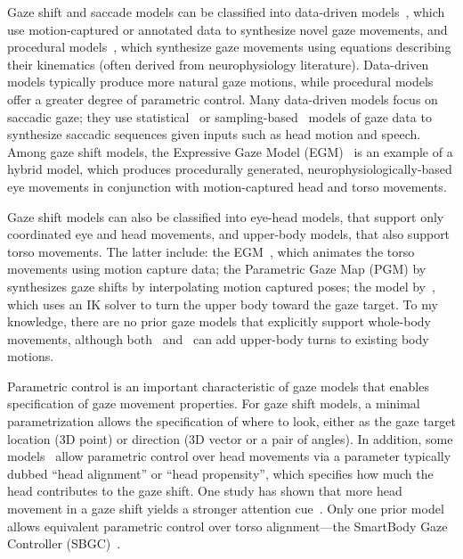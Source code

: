 Gaze shift and saccade models can be classified into data-driven models~\citep{heck2007automated,lance2010expressive,lee2002eyes,deng2005automated,ma2009natural,le2012live}, which use motion-captured or annotated data to synthesize novel gaze movements, and procedural models~\citep{peters2010animating,thiebaux2009realtime}, which synthesize gaze movements using equations describing their kinematics (often derived from neurophysiology literature). Data-driven models typically produce more natural gaze motions, while procedural models offer a greater degree of parametric control. Many data-driven models focus on saccadic gaze; they use statistical~\citep{lee2002eyes,ma2009natural,le2012live} or sampling-based~\citep{deng2005automated} models of gaze data to synthesize saccadic sequences given inputs such as head motion and speech. Among gaze shift models, the Expressive Gaze Model (EGM)~\citep{lance2010expressive} is an example of a hybrid model, which produces procedurally generated, neurophysiologically-based eye movements in conjunction with motion-captured head and torso movements.

Gaze shift models can also be classified into eye-head models, that support only coordinated eye and head movements, and upper-body models, that also support torso movements. The latter include: the EGM~\citep{lance2010expressive}, which animates the torso movements using motion capture data; the Parametric Gaze Map (PGM) by~\citet{heck2007automated} synthesizes gaze shifts by interpolating motion captured poses; the model by~\citet{grillon2009crowds}, which uses an IK solver to turn the upper body toward the gaze target. To my knowledge, there are no prior gaze models that explicitly support whole-body movements, although both~\citep{heck2007automated} and~\citep{grillon2009crowds} can add upper-body turns to existing body motions.

Parametric control is an important characteristic of gaze models that enables specification of gaze movement properties. For gaze shift models, a minimal parametrization allows the specification of where to look, either as the gaze target location (3D point) or direction (3D vector or a pair of angles). In addition, some models~\citep{peters2010animating,lance2010expressive,thiebaux2009realtime} allow parametric control over head movements via a parameter typically dubbed ``head alignment'' or ``head propensity'', which specifies how much the head contributes to the gaze shift. One study has shown that more head movement in a gaze shift yields a stronger attention cue~\citep{andrist2012designing}. Only one prior model allows equivalent parametric control over torso alignment---the SmartBody Gaze Controller (SBGC)~\citep{thiebaux2009realtime}.

